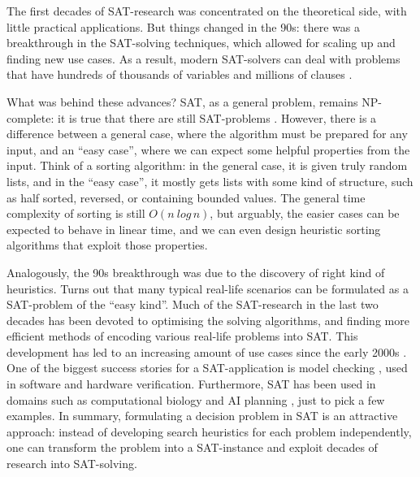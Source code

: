 The first decades of SAT-research was concentrated on the theoretical side, with little practical applications.
But things changed in the 90s: there was a breakthrough in the SAT-solving techniques, 
which allowed for scaling up and finding new use cases. As a result, modern SAT-solvers can deal with problems that have hundreds of thousands of variables and millions of clauses \cite{marques_silva2010}.

What was behind these advances? SAT, as a general problem, remains NP-complete: 
it is true that there are still SAT-problems .
However, there is a difference between a general case, where the algorithm must be prepared for any input, and an ``easy case'', where we can expect some helpful properties from the input.
Think of a sorting algorithm: in the general case, it is given truly random lists, and in the ``easy case'', it mostly gets lists with some kind of structure, such as half sorted, reversed, or containing bounded values. The general time complexity of sorting is still $O(n\ log\, n)$, but arguably, the easier cases can be expected to behave in linear time, and we can even design heuristic sorting algorithms that exploit those properties.

Analogously, the 90s breakthrough was due to the discovery of right kind of heuristics.
Turns out that many typical real-life scenarios can be formulated as a SAT-problem of the ``easy kind''.
Much of the SAT-research in the last two decades has been devoted to optimising the solving algorithms, and finding more efficient methods of encoding various real-life problems into SAT.
This development has led to an increasing amount of use cases since the early 2000s \cite{claessen2009satpractice}.
One of the biggest success stories for a SAT-application is model checking \cite{sheeran1998modelchecking;biere1999modelchecking;bradley2011modelchecking}, used in software and hardware verification. Furthermore, SAT has been used in domains such as computational biology \cite{claessen2013compbioSAT} and AI planning \cite{selman_kautz92aiplanning}, just to pick a few examples.
In summary, formulating a decision problem in SAT is an attractive approach: instead of developing search heuristics for each problem independently, one can transform the problem into a SAT-instance and exploit decades of research into SAT-solving. 

